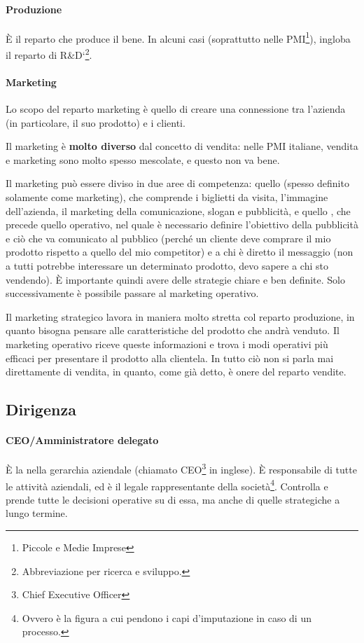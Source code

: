 \paragraph*{Produzione} È il reparto che produce il bene. In alcuni casi
(soprattutto nelle PMI\footnote{Piccole e Medie Imprese}), ingloba il
reparto di R\&D`\footnote{Abbreviazione per ricerca e sviluppo.}.

\paragraph*{Marketing}
\begin{definition}[Marketing]
Lo scopo del reparto marketing è quello di creare una connessione tra l'azienda
(in particolare, il suo prodotto) e i clienti.
\end{definition}

\noindent Il marketing è \textbf{molto diverso} dal concetto di vendita: nelle
PMI italiane, vendita e marketing sono molto spesso mescolate, e questo non va
bene.

Il marketing può essere diviso in due aree di competenza: quello
 (spesso definito solamente come marketing), che comprende
i biglietti da visita, l'immagine dell'azienda, il marketing della
comunicazione, slogan e pubblicità, e quello , che
precede quello operativo, nel quale è necessario definire l'obiettivo della
pubblicità e ciò che va comunicato al pubblico (perché un cliente deve comprare
il mio prodotto rispetto a quello del mio competitor) e a chi è diretto il
messaggio (non a tutti potrebbe interessare un determinato prodotto, devo
sapere a chi sto vendendo). È importante quindi avere delle strategie chiare e
ben definite. Solo successivamente è possibile passare al marketing operativo.

Il marketing strategico lavora in maniera molto stretta col reparto produzione,
in quanto bisogna pensare alle caratteristiche del prodotto che andrà venduto.
Il marketing operativo riceve queste informazioni e trova i modi operativi più
efficaci per presentare il prodotto alla clientela. In tutto ciò non si parla
mai direttamente di vendita, in quanto, come già detto, è onere del reparto
vendite.

\subsection{Dirigenza}

\paragraph*{CEO/Amministratore delegato} È la  nella gerarchia aziendale (chiamato CEO\footnote{Chief Executive
Officer} in inglese). È responsabile di tutte le attività aziendali, ed è il
legale rappresentante della società\footnote{Ovvero è la figura a cui pendono i
capi d'imputazione in caso di un processo.}. Controlla e prende tutte le
decisioni operative su di essa, ma anche di quelle strategiche a lungo
termine.

